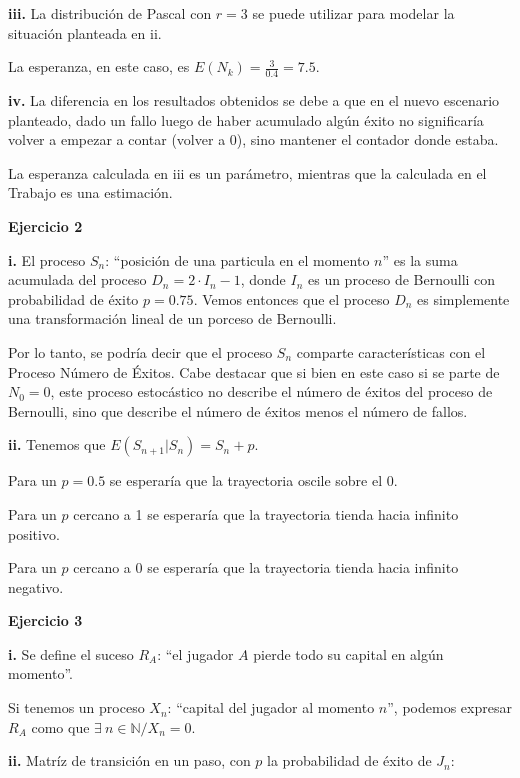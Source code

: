 \documentclass[11pt]{article}
\begin{document}
\textbf{iii.}
La distribución de Pascal con $r = 3$ se puede utilizar para modelar la situación planteada en ii.

La esperanza, en este caso, es $E(N_k) = \frac{3}{0.4} = 7.5$.

\textbf{iv.}
La diferencia en los resultados obtenidos se debe a que en el nuevo escenario planteado, dado un fallo luego de haber acumulado algún éxito no significaría volver a empezar a contar (volver a 0), sino mantener el contador donde estaba.

La esperanza calculada en iii es un parámetro, mientras que la calculada en el Trabajo es una estimación.

\textbf{Ejercicio 2}

\textbf{i.}
El proceso $S_n$: ``posición de una particula en el momento $n$'' es la suma acumulada del proceso $D_n = 2 \cdot I_n - 1$, donde $I_n$ es un proceso de Bernoulli con probabilidad de \'exito $p = 0.75$. Vemos entonces que el proceso $D_n$ es simplemente una transformación lineal de un porceso de Bernoulli. 

Por lo tanto, se podría decir que el proceso $S_n$ comparte características con el Proceso Número de \'Exitos. Cabe destacar que si bien en este caso si se parte de $N_0 = 0$, este proceso estocástico no describe el número de \'exitos del proceso de Bernoulli, sino que describe el número de \'exitos menos el número de fallos.

\textbf{ii.}
Tenemos que $E(S_{n+1}|S_n) = S_n + p$.

Para un $p = 0.5$ se esperaría que la trayectoria oscile sobre el 0.

Para un $p$ cercano a 1 se esperaría que la trayectoria tienda hacia infinito positivo.

Para un $p$ cercano a 0 se esperaría que la trayectoria tienda hacia infinito negativo.

\textbf{Ejercicio 3}

\textbf{i.}
Se define el suceso $R_A$: ``el jugador $A$ pierde todo su capital en algún momento''.

Si tenemos un proceso $X_n$: ``capital del jugador al momento $n$'', podemos expresar $R_A$ como que $\exists\ n \in \mathbb{N} / X_n = 0$.

\textbf{ii.}
Matríz de transición en un paso, con $p$ la probabilidad de éxito de $J_n$:
\end{document}
